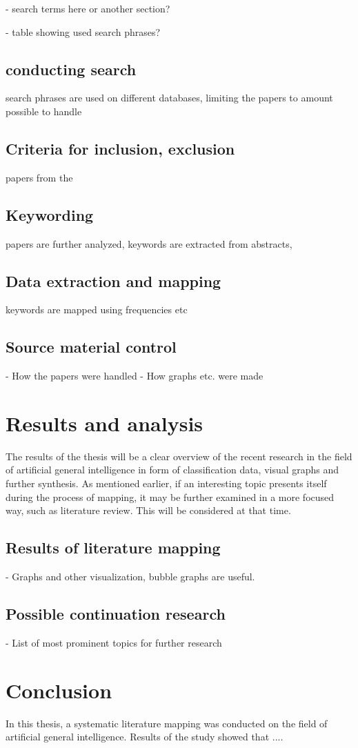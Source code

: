 \documentclass[utf8,english]{gradu3}
\begin{document}
- search terms here or another section? 

- table showing used search phrases?

\section{conducting search}
search phrases are used on different databases, limiting the papers to amount possible to handle

\section{Criteria for inclusion, exclusion}
papers from the 

\section{Keywording}
papers are further analyzed, keywords are extracted from abstracts, 

\section{Data extraction and mapping}
keywords are mapped using frequencies etc

\section{Source material control}
- How the papers were handled
- How graphs etc. were made

\chapter{Results and analysis}
The results of the thesis will be a clear overview of the recent research in the field of artificial general intelligence in form of classification data, visual graphs and further synthesis. As mentioned earlier, if an interesting topic presents itself during the process of mapping, it may be further examined in a more focused way, such as literature review. This will be considered at that time.

\section{Results of literature mapping}
- Graphs and other visualization, bubble graphs are useful.

\section{Possible continuation research}

- List of most prominent topics for further research

\chapter{Conclusion}
In this thesis, a systematic literature mapping was conducted on the field of artificial general intelligence. Results of the study showed that .... 

\printbibliography
\end{document}
